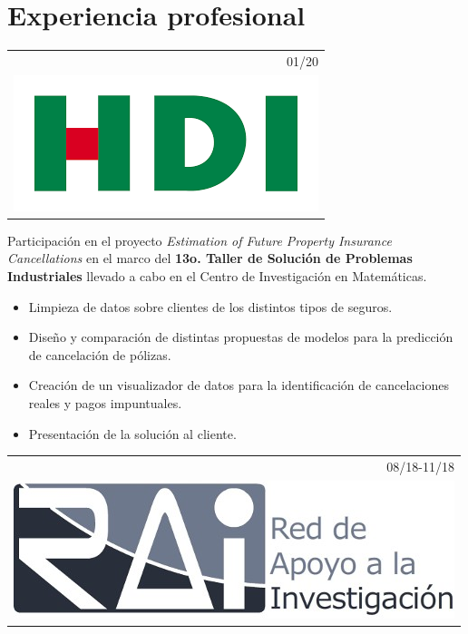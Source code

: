\documentclass[]{friggeri-cv}
\begin{document}
\section{Experiencia profesional}
\begin{entrylist}
\entry
   {   \begin{tabular}{r}
    		01/20\\
     		\hspace{0.87cm}\includegraphics[scale=0.15]{img/hdi.png}
	\end{tabular}
    }
    {\vspace{-0.91cm}}
    { }
    {Participación en el proyecto \textsl{Estimation of Future Property Insurance Cancellations} en el marco del \textbf{13o. Taller de Solución de Problemas Industriales} llevado a cabo en el Centro de Investigación en Matemáticas.
    \begin{itemize}
	\item Limpieza de datos sobre clientes de los distintos tipos de seguros.
	\item Diseño y comparación de distintas propuestas de modelos para la predicción de cancelación de pólizas.
	\item Creación de un visualizador de datos para la identificación de cancelaciones reales y pagos impuntuales.
	\item Presentación de la solución al cliente.
    \end{itemize}}
\entry
   {   \begin{tabular}{r}
    		08/18-11/18\\
     		\includegraphics[scale=0.15]{img/RAI.jpg}
	\end{tabular}
    }
    {\vspace{-0.95cm}}

\end{entrylist}
\end{document}
